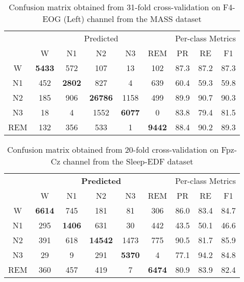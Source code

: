 \documentclass[journal,twoside]{IEEEtran}
\let\MYoriglatexcaption\caption
\renewcommand{\caption}[2][\relax]{\MYoriglatexcaption[#2]{#2}}
\begin{document}
\begin{table}[!t]
\renewcommand{\arraystretch}{1.3}
\caption{Confusion matrix obtained from 31-fold cross-validation on F4-EOG (Left) channel from the MASS dataset}
\label{tab:cm_deepsleepnet_mass_f4}
\centering
\begin{tabular}{|c|ccccc|ccc|}
\hline
 & \multicolumn{5}{c|}{Predicted} & \multicolumn{3}{c|}{Per-class Metrics} \\
 & W & N1 & N2 & N3 & REM & PR & RE & F1 \\ \hline
W & \textbf{5433} & 572 & 107 & 13 & 102 & 87.3 & 87.2 & 87.3 \\
N1 & 452 & \textbf{2802} & 827 & 4 & 639 & 60.4 & 59.3 & 59.8 \\
N2 & 185 & 906 & \textbf{26786} & 1158 & 499 & 89.9 & 90.7 & 90.3 \\
N3 & 18 & 4 & 1552 & \textbf{6077} & 0 & 83.8 & 79.4 & 81.5 \\
REM & 132 & 356 & 533 & 1 & \textbf{9442} & 88.4 & 90.2 & 89.3 \\ \hline
\end{tabular}
\end{table}

\begin{table}[!t]
\renewcommand{\arraystretch}{1.3}
\caption{Confusion matrix obtained from 20-fold cross-validation on Fpz-Cz channel from the Sleep-EDF dataset}
\label{tab:cm_deepsleepnet_sleepedf_fpz}
\centering
\begin{tabular}{|c|ccccc|ccc|}
\hline
\textbf{} & \multicolumn{5}{c|}{\textbf{Predicted}}                                        & \multicolumn{3}{c|}{Per-class Metrics} \\
          & W             & N1            & N2             & N3            & REM           & PR          & RE          & F1         \\ \hline
W         & \textbf{6614} & 745           & 181            & 81            & 306           & 86.0        & 83.4        & 84.7       \\
N1        & 295           & \textbf{1406} & 631            & 30            & 442           & 43.5        & 50.1        & 46.6       \\
N2        & 391           & 618           & \textbf{14542} & 1473          & 775           & 90.5        & 81.7        & 85.9       \\
N3        & 29            & 9             & 291            & \textbf{5370} & 4             & 77.1        & 94.2        & 84.8       \\
REM       & 360           & 457           & 419            & 7             & \textbf{6474} & 80.9        & 83.9        & 82.4       \\ \hline
\end{tabular}
\end{table}
\end{document}
